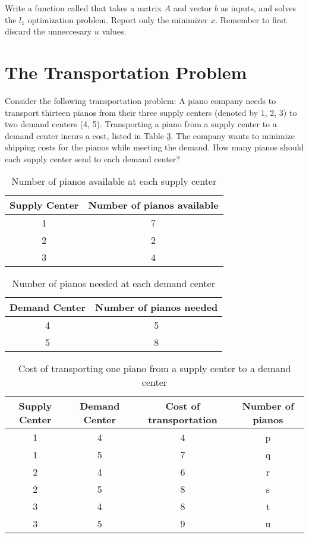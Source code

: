 \begin{problem}
Write a function called  that takes a matrix $A$ and vector $b$ as inputs, and solves the $l_1$ optimization problem. 
Report only the minimizer $x$. Remember to first discard the unneccesary $u$ values.
\end{problem}

\section*{The Transportation Problem}

Consider the following transportation problem:
A piano company needs to transport thirteen pianos from their three  supply centers (denoted by 1, 2, 3) to two demand centers (4, 5).
Transporting a piano from a supply center to a demand center incurs a cost, listed in Table \ref{tab:cost}.
The company wants to minimize shipping costs for the pianos while meeting the demand.
How many pianos should each supply center send to each demand center?

\begin{table}[h]
\centering
\begin{tabular}{|c|c|}
Supply Center & Number of pianos available\\
\hline
1 & 7\\
2 & 2\\
3 & 4\\
\end{tabular}

\caption{Number of pianos available at each supply center}
\label{tab:supply}
\end{table}

\begin{table}[h]
\centering
\begin{tabular}{|c|c|}
Demand Center & Number of pianos needed\\
\hline
4 & 5\\
5 & 8\\
\end{tabular}

\caption{Number of pianos needed at each demand center}
\label{tab:demand}
\end{table}

\begin{table}[h]
\centering
\begin{tabular}{|c|c|c|c|}
Supply Center & Demand Center & Cost of transportation & Number of pianos\\
\hline
1 & 4 & 4 & p\\
1 & 5 & 7 & q\\
2 & 4 & 6 & r\\
2 & 5 & 8 & s\\
3 & 4 & 8 & t\\
3 & 5 & 9 & u\\
\end{tabular}
\caption{Cost of transporting one piano from a supply center to a demand center}
\label{tab:cost}
\end{table}


